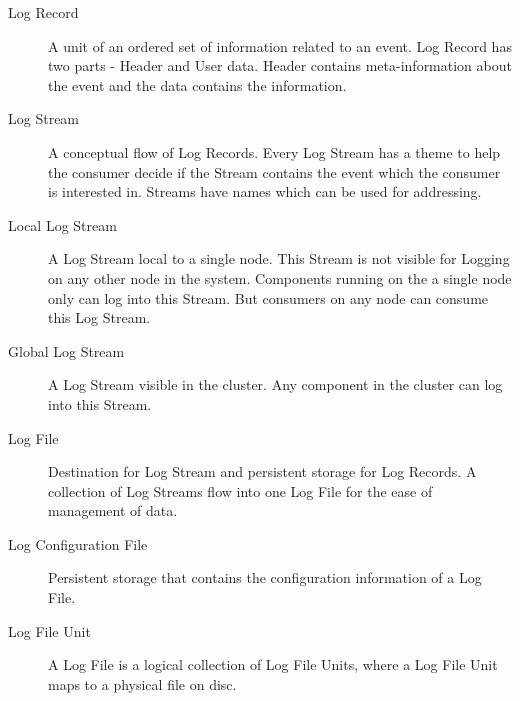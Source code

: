 \begin{flushleft}
\begin{description}

\item[Log Record] A unit of an ordered set of information related to an event. Log Record has two parts - Header and User data. Header contains 
meta-information about the event and the data contains the information.
\end{description}

\begin{description}

\item[Log Stream] A conceptual flow of Log Records. Every Log Stream has a theme to help the consumer decide if the Stream contains the event which 
the consumer is interested in. Streams have names which can be used for addressing.
\end{description}

\begin{description}

\item[Local Log Stream] A Log Stream local to a single node. This Stream is not visible for Logging on any other node in the system. Components running 
on the a single node only can log into this Stream. But consumers on any node can consume this Log Stream.
\end{description}


\begin{description}
\item[Global Log Stream] A Log Stream visible in the cluster. Any component in the cluster can log into this Stream.
\end{description}

\begin{description}
\item[Log File] Destination for Log Stream and persistent storage for Log Records. A collection of Log Streams flow into one Log File for the ease of 
management of data.
\end{description}


\begin{description}
\item[Log Configuration File] Persistent storage that contains the configuration information of a Log File. 
\end{description}

\begin{description}
\item[Log File Unit] A Log File is a logical collection of Log File Units, where a Log File Unit maps to a physical file on disc.
\end{description}


\end{flushleft}
